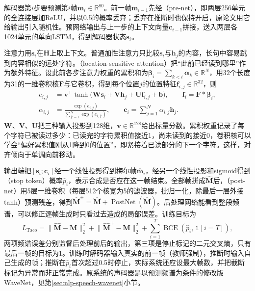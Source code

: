 解码器第$i$步要预测第$i$帧$\bm{m}_i\in\mathbb{R}^{80}$。前一帧$\bm{m}_{i-1}$先经（pre-net），即两层256单元的全连接层加ReLU，并以0.5的概率丢弃；丢弃在推断时也保持开启，原论文用它给输出引入随机性。预网络输出与上一步的上下文向量$\bm{c}_{i-1}$拼接，送入两层各1024单元的单向LSTM，得到解码器状态$\bm{s}_i$。

注意力用$\bm{s}_i$在$\bm{H}$上取上下文。普通加性注意力只比较$\bm{s}_i$与$\bm{h}_j$的内容，长句中容易跳到内容相似的远处字符。（location-sensitive attention）把“此前已经读到哪里”作为额外特征。设此前各步注意力权重的累积和为$\bm{\beta}_{i}=\sum_{k<i}\bm{\alpha}_k\in\mathbb{R}^{N}$，用$32$个长度为31的一维卷积核$\bm{F}$与它卷积，得到每个位置$j$的位置特征$\bm{f}_{i,j}\in\mathbb{R}^{32}$，则
\begin{equation}
\begin{aligned}
  e_{i,j}&=\bm{v}^{\top}\tanh\bigl(\bm{W}\bm{s}_i+\bm{V}\bm{h}_j+\bm{U}\bm{f}_{i,j}+\bm{b}\bigr),\qquad
  \bm{f}_{i}=\bm{F}*\bm{\beta}_{i},\\
  \alpha_{i,j}&=\frac{\exp(e_{i,j})}{\sum_{j'=1}^{N}\exp(e_{i,j'})},\qquad
  \bm{c}_i=\sum_{j=1}^{N}\alpha_{i,j}\bm{h}_j .
\end{aligned}
\label{eq:nlp-speech-location-attention}
\end{equation}
$\bm{W}$、$\bm{V}$、$\bm{U}$把三种输入投影到128维，$\bm{v}\in\mathbb{R}^{128}$给出标量分数。累积权重记录了每个字符已被读过多少：已读完的字符累积值接近1，尚未读到的接近0，卷积核可以学会“偏好累积值刚从1降到0的位置”，即紧接着已读部分的下一个字符。这样，对齐倾向于单调向前移动。

输出端把$[\bm{s}_i;\bm{c}_i]$经一个线性投影得到梅尔帧$\hat{\bm{m}}_i$，经另一个线性投影和sigmoid得到（stop token）概率$\hat p_i$，表示合成是否应在这一帧结束。全部帧拼成$\widehat{\bm{M}}$后，（post-net）用5层一维卷积（每层512个核宽为5的滤波器，批归一化，除最后一层外接tanh）预测残差，得到$\widehat{\bm{M}}^{+}=\widehat{\bm{M}}+\operatorname{PostNet}(\widehat{\bm{M}})$。后处理网络能看到整段频谱，可以修正逐帧生成时只看过去造成的局部误差。训练目标为
\begin{equation}
  L_{\mathrm{Taco}}=\lVert\widehat{\bm{M}}-\bm{M}\rVert_2^2
  +\lVert\widehat{\bm{M}}^{+}-\bm{M}\rVert_2^2
  +\sum_{i=1}^{T}\operatorname{BCE}(\hat p_i,\,\mathbb{1}[i=T]),
  \label{eq:nlp-speech-tacotron-loss}
\end{equation}
两项频谱误差分别监督后处理前后的输出，第三项是停止标记的二元交叉熵，只有最后一帧的目标为1。训练时解码器输入真实的前一帧（教师强制），推断时输入自己生成的帧；推断在$\hat p_i$首次超过0.5时停止，实际系统还应设最大帧数，并把截断标记为异常而非正常完成。原系统的声码器是以预测频谱为条件的修改版WaveNet，见第\ref{sec:nlp-speech-wavenet}小节。


